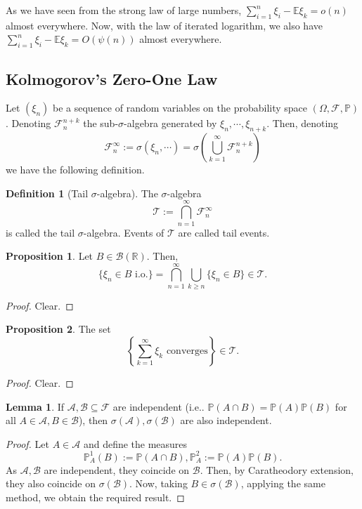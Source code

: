 \documentclass[]{article}
\theoremstyle{definition}
\theoremstyle{definition}
\newtheorem{definition}{Definition}[section]
\newtheorem{lemma}{Lemma}[section]
\newtheorem{proposition}{Proposition}[section]
\begin{document}
As we have seen from the strong law of large numbers, 
\(\sum_{i = 1}^n \xi_i - \mathbb{E}\xi_k = o(n)\) almost everywhere. Now, with 
the law of iterated logarithm, we also have 
\(\sum_{i = 1}^n \xi_i - \mathbb{E}\xi_k = O(\psi(n))\) almost everywhere.

\subsection{Kolmogorov's Zero-One Law}

Let \((\xi_n)\) be a sequence of random variables on the probability space 
\((\Omega, \mathcal{F}, \mathbb{P})\). Denoting \(\mathcal{F}_n^{n + k}\) the 
sub-\(\sigma\)-algebra generated by \(\xi_n, \cdots, \xi_{n + k}\). Then, 
denoting 
\[\mathcal{F}_n^\infty := \sigma(\xi_n, \cdots) = 
  \sigma\left(\bigcup_{k = 1}^\infty \mathcal{F}_n^{n + k}\right)\]
we have the following definition.

\begin{definition}[Tail \(\sigma\)-algebra]
  The \(\sigma\)-algebra 
  \[\mathcal{T} := \bigcap_{n = 1}^\infty \mathcal{F}_n^\infty\]
  is called the tail \(\sigma\)-algebra. Events of \(\mathcal{T}\) are called 
  tail events.
\end{definition}

\begin{proposition}
  Let \(B \in \mathcal{B}(\mathbb{R})\). Then, 
  \[\{\xi_n \in B \text{ i.o.}\} = 
    \bigcap_{n = 1}^\infty \bigcup_{k \ge n} \{\xi_n \in B\} \in \mathcal{T}.\]
\end{proposition}
\begin{proof}
  Clear.
\end{proof}

\begin{proposition}
  The set 
  \[\left\{\sum_{k = 1}^\infty \xi_k \text{ converges}\right\} \in \mathcal{T}.\]
\end{proposition}
\begin{proof}
  Clear.
\end{proof}

\begin{lemma}
  If \(\mathcal{A}, \mathcal{B} \subseteq \mathcal{F}\) are independent 
  (i.e.. \(\mathbb{P}(A \cap B) = \mathbb{P}(A)\mathbb{P}(B)\) for all 
  \(A \in \mathcal{A}, B \in \mathcal{B}\)), then \(\sigma(\mathcal{A}), 
  \sigma(\mathcal{B})\) are also independent.
\end{lemma}
\begin{proof}
  Let \(A \in \mathcal{A}\) and define the measures
  \[\mathbb{P}_A^1 (B) := \mathbb{P}(A \cap B), \mathbb{P}_A^2 := \mathbb{P}(A)\mathbb{P}(B).\]
  As \(\mathcal{A}, \mathcal{B}\) are independent, they coincide on \(\mathcal{B}\). 
  Then, by Caratheodory extension, they also coincide on \(\sigma(\mathcal{B})\). 
  Now, taking \(B \in \sigma(\mathcal{B})\), applying the same method, we 
  obtain the required result.
\end{proof}
\end{document}
